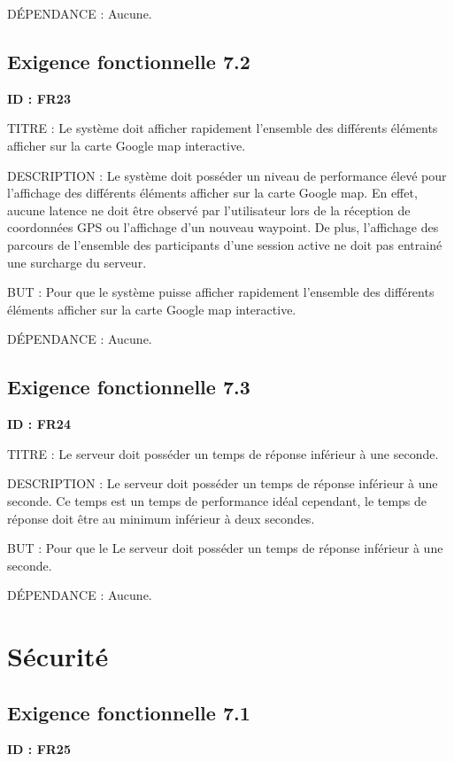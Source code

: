 \documentclass[titlepage, 12pt]{report}
\begin{document}
DÉPENDANCE : Aucune.

\subsection{Exigence fonctionnelle 7.2}

\textbf{ID : FR23}

TITRE : Le système doit afficher rapidement l'ensemble des différents éléments afficher sur la carte Google map interactive.

DESCRIPTION : Le système doit posséder un niveau de performance élevé pour l'affichage des différents éléments afficher sur la carte Google map. En effet, aucune latence ne doit être observé par l'utilisateur lors de la réception de coordonnées GPS ou l'affichage d'un nouveau waypoint. De plus, l'affichage des parcours de l'ensemble des participants d'une session active ne doit pas entrainé une surcharge du serveur. 

BUT : Pour que le système puisse afficher rapidement l'ensemble des différents éléments afficher sur la carte Google map interactive.

DÉPENDANCE : Aucune.

\subsection{Exigence fonctionnelle 7.3}

\textbf{ID : FR24}

TITRE : Le serveur doit posséder un temps de réponse inférieur à une seconde.

DESCRIPTION : Le serveur doit posséder un temps de réponse inférieur à une seconde. Ce temps est un temps de performance idéal cependant, le temps de réponse doit être au minimum inférieur à deux secondes.  

BUT : Pour que le Le serveur doit posséder un temps de réponse inférieur à une seconde.

DÉPENDANCE : Aucune.

\section{Sécurité}

\subsection{Exigence fonctionnelle 7.1}

\textbf{ID : FR25}
\end{document}
